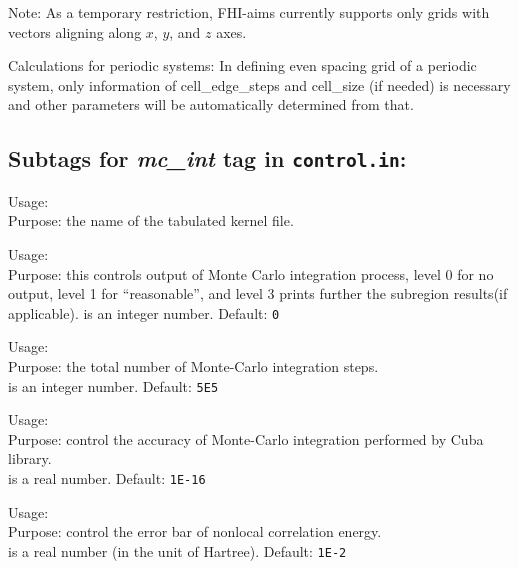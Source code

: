 Note: As a temporary restriction, FHI-aims currently supports only
grids with vectors aligning along $x$, $y$, and $z$ axes.

Calculations for periodic systems: In defining even spacing grid of
a periodic system, only information of cell\_edge\_steps and
cell\_size (if needed) is necessary and other parameters will be
automatically determined from that.

\newpage

\subsection*{Subtags for \emph{mc\_int} tag in \texttt{control.in}:}

 {
  \noindent
  Usage:   \\[1.0ex]
  Purpose: the name of the tabulated kernel file.  }

 {
  \noindent
  Usage:   \\[1.0ex]
  Purpose: this controls output of Monte Carlo integration process,
  level 0 for no output, level 1 for ``reasonable'', and level 3
  prints further the subregion results(if applicable).
   is an integer number. Default: \texttt{0} \\
}

 {
  \noindent
  Usage:   \\[1.0ex]
  Purpose: the total number of Monte-Carlo integration steps.\\[1.0ex]
   is an integer number. Default: \texttt{5E5}\\
}

 {
  \noindent
  Usage:   \\[1.0ex]
  Purpose: control the accuracy of Monte-Carlo integration performed by Cuba library.\\[1.0ex]
   is a real number. Default: \texttt{1E-16}\\
}

  {
  \noindent
  Usage:   \\[1.0ex]
  Purpose: control the error bar of nonlocal correlation energy.\\[1.0ex]
   is a real number (in the unit of Hartree). Default: \texttt{1E-2}\\
}

